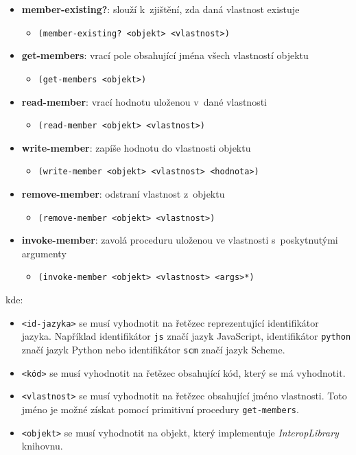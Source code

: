 \documentclass[
  master,
  biblatex,
  figures=true,
  theorems,
  sourcecodes,
  glossaries,
  index
]{kidiplom}
\begin{document}
\begin{itemize}
    \item \textbf{member-existing?}: slouží k~zjištění, zda daná vlastnost existuje
    \begin{itemize}
        \item \texttt{(member-existing? <objekt> <vlastnost>)} 
    \end{itemize}

    \item \textbf{get-members}: vrací pole obsahující jména všech vlastností objektu
    \begin{itemize}
        \item \texttt{(get-members <objekt>)} 
    \end{itemize}

    \item \textbf{read-member}: vrací hodnotu uloženou v~dané vlastnosti 
    \begin{itemize}
        \item \texttt{(read-member <objekt> <vlastnost>)} 
    \end{itemize}

    \item \textbf{write-member}: zapíše hodnotu do vlastnosti objektu
    \begin{itemize}
        \item \texttt{(write-member <objekt> <vlastnost> <hodnota>)} 
    \end{itemize}

    \item \textbf{remove-member}: odstraní vlastnost z~objektu
    \begin{itemize}
        \item \texttt{(remove-member <objekt> <vlastnost>)} 
    \end{itemize}

    \item \textbf{invoke-member}: zavolá proceduru uloženou ve vlastnosti s~poskytnutými argumenty
    \begin{itemize}
        \item \texttt{(invoke-member <objekt> <vlastnost> <args>*)} 
    \end{itemize}
\end{itemize}

kde:

\begin{itemize}
    \item \texttt{<id-jazyka>} se musí vyhodnotit na řetězec reprezentující identifikátor jazyka. Například identifikátor \texttt{js} značí jazyk JavaScript, identifikátor \texttt{python} značí jazyk Python nebo identifikátor \texttt{scm} značí jazyk Scheme.
    \item \texttt{<kód>} se musí vyhodnotit na řetězec obsahující kód, který se má vyhodnotit.
    \item \texttt{<vlastnost>} se musí vyhodnotit na řetězec obsahující jméno vlastnosti. Toto jméno je možné získat pomocí primitivní procedury \texttt{get-members}.
    \item \texttt{<objekt>} se musí vyhodnotit na objekt, který implementuje \textit{InteropLibrary} knihovnu.
\end{itemize}
\end{document}
